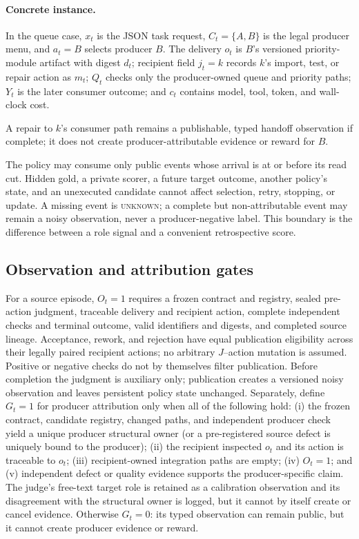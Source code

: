 \documentclass[sigconf,anonymous]{aamas}
\newcommand{\unknown}{\textsc{unknown}}
\begin{document}
\paragraph{Concrete instance.} In the queue case, $x_t$ is the JSON task request, $C_t=\{A,B\}$ is the legal producer menu, and $a_t=B$ selects producer $B$. The delivery $o_t$ is $B$'s versioned priority-module artifact with digest $d_t$; recipient field $j_t=k$ records $k$'s import, test, or repair action as $m_t$; $Q_t$ checks only the producer-owned queue and priority paths; $Y_t$ is the later consumer outcome; and $c_t$ contains model, tool, token, and wall-clock cost.

A repair to $k$'s consumer path remains a publishable, typed handoff observation if complete; it does not create producer-attributable evidence or reward for $B$.

The policy may consume only public events whose arrival is at or before its read cut. Hidden gold, a private scorer, a future target outcome, another policy's state, and an unexecuted candidate cannot affect selection, retry, stopping, or update. A missing event is \unknown{}; a complete but non-attributable event may remain a noisy observation, never a producer-negative label. This boundary is the difference between a role signal and a convenient retrospective score.

\subsection{Observation and attribution gates}
For a source episode, $O_t=1$ requires a frozen contract and registry, sealed pre-action judgment, traceable delivery and recipient action, complete independent checks and terminal outcome, valid identifiers and digests, and completed source lineage. Acceptance, rework, and rejection have equal publication eligibility across their legally paired recipient actions; no arbitrary $J$--action mutation is assumed. Positive or negative checks do not by themselves filter publication. Before completion the judgment is auxiliary only; publication creates a versioned noisy observation and leaves persistent policy state unchanged. Separately, define $G_t=1$ for producer attribution only when all of the following hold: (i) the frozen contract, candidate registry, changed paths, and independent producer check yield a unique producer structural owner (or a pre-registered source defect is uniquely bound to the producer); (ii) the recipient inspected $o_t$ and its action is traceable to $o_t$; (iii) recipient-owned integration paths are empty; (iv) $O_t=1$; and (v) independent defect or quality evidence supports the producer-specific claim. The judge's free-text target role is retained as a calibration observation and its disagreement with the structural owner is logged, but it cannot by itself create or cancel evidence. Otherwise $G_t=0$: its typed observation can remain public, but it cannot create producer evidence or reward.
\end{document}
